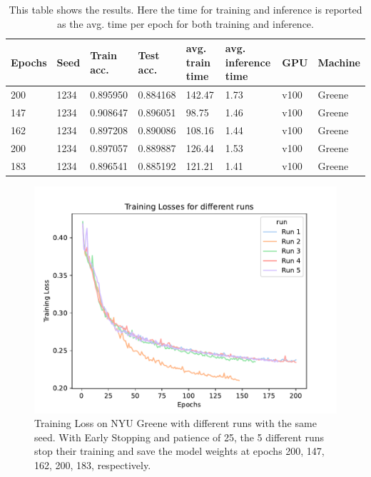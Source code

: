 \documentclass[sigplan,screen]{acmart}
\begin{document}


\begin{table}[thb]
    \centering
    \caption{This table shows the results. Here the time for training and inference is reported as the avg. time per epoch for both training and inference.}
    \begin{tabular}{|l|l|l|l|l|l|l|l|}
    \hline
        Epochs & Seed & Train acc. & Test acc.  & avg. train time  & avg. inference time & GPU & Machine\\ \hline
        200 & 1234 & 0.895950 & 0.884168 & 142.47 & 1.73 & v100 & Greene \\ \hline
        147 & 1234 & 0.908647 & 0.896051 & 98.75 & 1.46 & v100 & Greene\\ \hline
        162 & 1234 & 0.897208 & 0.890086 & 108.16 & 1.44 & v100 & Greene\\ \hline
        200 & 1234 & 0.897057 & 0.889887 & 126.44 & 1.53 & v100 & Greene\\ \hline
        183 & 1234 & 0.896541 & 0.885192 & 121.21 & 1.41 & v100 & Greene \\ \hline
    \end{tabular}
    \label{tab: Results}
\end{table}


\begin{figure}[htb]
\centering\includegraphics[width=1.0\columnwidth]{images/training_loss_diff_runs.pdf}
\caption{Training Loss on NYU Greene with different runs with the same seed. With Early Stopping and patience of 25, the 5 different runs stop their training and save the model weights at epochs 200, 147, 162, 200, 183, respectively.}
\label{fig:Training loss}
\end{figure}
\end{document}
